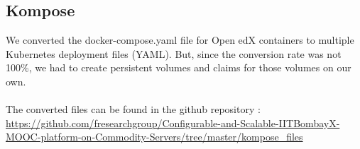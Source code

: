 \documentclass[12pt]{report}
\begin{document}
\subsection{Kompose}
We converted the docker-compose.yaml file for Open edX containers to multiple Kubernetes deployment files (YAML). But, since the conversion rate was not 100\%, we had to create persistent volumes and claims for those volumes on our own.\\\\
The converted files can be found in the github repository : \\ \href{https://github.com/fresearchgroup/Configurable-and-Scalable-IITBombayX-MOOC-platform-on-Commodity-Servers/tree/master/kompose_files}{https://github.com/fresearchgroup/Configurable-and-Scalable-IITBombayX-MOOC-platform-on-Commodity-Servers/tree/master/kompose\_files} \cite{Komposefiles}
\end{document}
